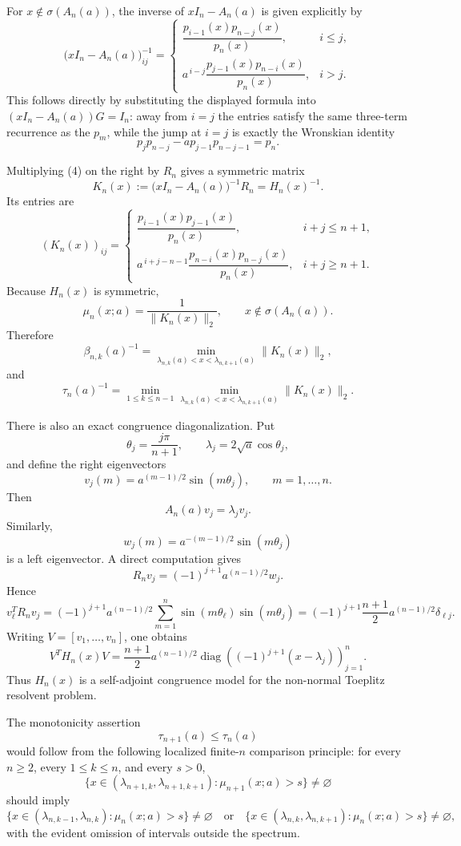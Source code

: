 \documentclass[11pt]{article}
\begin{document}
For \(x\notin\sigma(A_n(a))\), the inverse of \(xI_n-A_n(a)\) is given explicitly by
\[
\bigl(xI_n-A_n(a)\bigr)^{-1}_{ij}
=
\begin{cases}
\dfrac{p_{i-1}(x)p_{n-j}(x)}{p_n(x)}, & i\le j,\\[8pt]
a^{\,i-j}\dfrac{p_{j-1}(x)p_{n-i}(x)}{p_n(x)}, & i>j.
\end{cases}
\tag{4}
\]
This follows directly by substituting the displayed formula into
\((xI_n-A_n(a))G=I_n\): away from \(i=j\) the entries satisfy the same
three-term recurrence as the \(p_m\), while the jump at \(i=j\) is exactly
the Wronskian identity
\[
p_jp_{n-j}-ap_{j-1}p_{n-j-1}=p_n.
\]

Multiplying (4) on the right by \(R_n\) gives a symmetric matrix
\[
K_n(x):=\bigl(xI_n-A_n(a)\bigr)^{-1}R_n=H_n(x)^{-1}.
\]
Its entries are
\[
(K_n(x))_{ij}
=
\begin{cases}
\dfrac{p_{i-1}(x)p_{j-1}(x)}{p_n(x)}, & i+j\le n+1,\\[10pt]
a^{\,i+j-n-1}\dfrac{p_{n-i}(x)p_{n-j}(x)}{p_n(x)}, & i+j\ge n+1.
\end{cases}
\tag{5}
\]
Because \(H_n(x)\) is symmetric,
\[
\mu_n(x;a)=\frac{1}{\|K_n(x)\|_2},
\qquad x\notin\sigma(A_n(a)).
\tag{6}
\]
Therefore
\[
\beta_{n,k}(a)^{-1}
=
\min_{\lambda_{n,k}(a)<x<\lambda_{n,k+1}(a)}
\|K_n(x)\|_2,
\tag{7}
\]
and
\[
\tau_n(a)^{-1}
=
\min_{1\le k\le n-1}
\min_{\lambda_{n,k}(a)<x<\lambda_{n,k+1}(a)}
\|K_n(x)\|_2.
\tag{8}
\]

There is also an exact congruence diagonalization. Put
\[
\theta_j=\frac{j\pi}{n+1},\qquad
\lambda_j=2\sqrt a\cos\theta_j,
\]
and define the right eigenvectors
\[
v_j(m)=a^{(m-1)/2}\sin(m\theta_j),
\qquad m=1,\dots,n.
\]
Then
\[
A_n(a)v_j=\lambda_jv_j.
\]
Similarly,
\[
w_j(m)=a^{-(m-1)/2}\sin(m\theta_j)
\]
is a left eigenvector. A direct computation gives
\[
R_nv_j=(-1)^{j+1}a^{(n-1)/2}w_j.
\]
Hence
\[
v_\ell^{T}R_nv_j
=
(-1)^{j+1}a^{(n-1)/2}
\sum_{m=1}^{n}\sin(m\theta_\ell)\sin(m\theta_j)
=
(-1)^{j+1}\frac{n+1}{2}a^{(n-1)/2}\delta_{\ell j}.
\]
Writing \(V=[v_1,\dots,v_n]\), one obtains
\[
\boxed{\;
V^TH_n(x)V
=
\frac{n+1}{2}a^{(n-1)/2}
\operatorname{diag}\!\left(
(-1)^{j+1}(x-\lambda_j)
\right)_{j=1}^n.
\;}
\tag{9}
\]
Thus \(H_n(x)\) is a self-adjoint congruence model for the non-normal
Toeplitz resolvent problem.

The monotonicity assertion
\[
\tau_{n+1}(a)\le \tau_n(a)
\tag{10}
\]
would follow from the following localized finite-\(n\) comparison principle:
for every \(n\ge2\), every \(1\le k\le n\), and every \(s>0\),
\[
\{x\in(\lambda_{n+1,k},\lambda_{n+1,k+1}):\mu_{n+1}(x;a)>s\}\ne\varnothing
\]
should imply
\[
\{x\in(\lambda_{n,k-1},\lambda_{n,k}):\mu_n(x;a)>s\}\ne\varnothing
\quad\text{or}\quad
\{x\in(\lambda_{n,k},\lambda_{n,k+1}):\mu_n(x;a)>s\}\ne\varnothing,
\tag{11}
\]
with the evident omission of intervals outside the spectrum.
\end{document}
